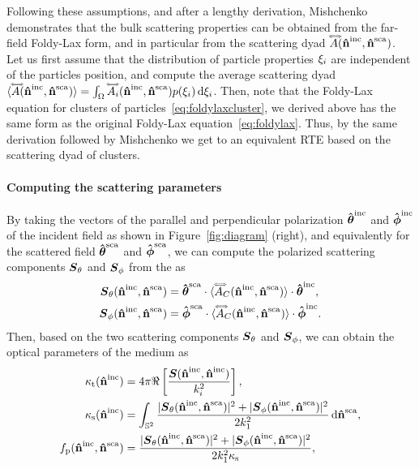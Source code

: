 Following these assumptions, and after a lengthy derivation, Mishchenko demonstrates that the bulk scattering properties can be obtained from the far-field Foldy-Lax form, and in particular from the scattering dyad $\accentset{\Longleftrightarrow}{A}(\mathbf{\hat{n}}^{\text{inc}},\mathbf{\hat{n}}^{\text{sca}})$. Let us first assume that the distribution of particle properties $\xi_i$ are independent of the particles position, and compute the average scattering dyad ${\langle \accentset{\Longleftrightarrow}{A}(\mathbf{\hat{n}}^{\text{inc}},\mathbf{\hat{n}}^{\text{sca}}) \rangle} = \int_\Omega \accentset{\Longleftrightarrow}{A}_i(\mathbf{\hat{n}}^{\text{inc}},\mathbf{\hat{n}}^{\text{sca}}) p(\xi_i) \,\text{d}\xi_i$. 
%
Then, note that the Foldy-Lax equation for clusters of particles~\eqref{eq:foldylaxcluster}, we derived above has the same form as the original Foldy-Lax equation~\eqref{eq:foldylax}. Thus, by the same derivation followed by Mishchenko we get to an equivalent RTE based on the scattering dyad of clusters. 

\paragraph{Computing the scattering parameters}
By taking the vectors of the parallel and perpendicular polarization $\mathbf{\hat{\boldsymbol\theta}}^\text{inc}$ and $\mathbf{\hat{\boldsymbol\phi}}^\text{inc}$ of the incident field as shown in Figure~\ref{fig:diagram} (right), and equivalently for the scattered field $\mathbf{\hat{\boldsymbol\theta}}^\text{sca}$ and $\mathbf{\hat{\boldsymbol\phi}}^\text{sca}$, we can compute the polarized scattering components $\boldsymbol{S}_\theta$ and $\boldsymbol{S}_\phi$ from the as
%
\begin{align}
  \boldsymbol{S}_\theta(\mathbf{\hat{n}}^{\text{inc}},\mathbf{\hat{n}}^{\text{sca}}) &= \mathbf{\hat{\boldsymbol\theta}}^\text{sca} \cdot {\langle \accentset{\Longleftrightarrow}{A}_C(\mathbf{\hat{n}}^{\text{inc}},\mathbf{\hat{n}}^{\text{sca}}) \rangle} \cdot \mathbf{\hat{\boldsymbol\theta}}^\text{inc}, \nonumber \\
  \boldsymbol{S}_\phi(\mathbf{\hat{n}}^{\text{inc}},\mathbf{\hat{n}}^{\text{sca}}) &= \mathbf{\hat{\boldsymbol\phi}}^\text{sca} \cdot {\langle \accentset{\Longleftrightarrow}{A}_C(\mathbf{\hat{n}}^{\text{inc}},\mathbf{\hat{n}}^{\text{sca}}) \rangle} \cdot \mathbf{\hat{\boldsymbol\phi}}^\text{inc}.
\end{align}
%
Then, based on the two scattering components $\boldsymbol{S}_\theta$ and $\boldsymbol{S}_\phi$, we can obtain the optical parameters of the medium as
%
\begin{align}
    \label{eq:crosstcluster}
    \kappa_\mathrm{t}(\mathbf{\hat{n}}^{\text{inc}}) &= 4\pi \Re\left[\frac{\boldsymbol{S}(\mathbf{\hat{n}}^{\text{inc}},\mathbf{\hat{n}}^{\text{inc}})}{k_i^2}\right], \\
    \label{eq:crossscluster}
    \kappa_\mathrm{s}(\mathbf{\hat{n}}^{\text{inc}}) &=\int_{\mathbb{S}^2} \frac{|\boldsymbol{S}_\theta(\mathbf{\hat{n}}^{\text{inc}},\mathbf{\hat{n}}^{\text{sca}})|^2+|\boldsymbol{S}_\phi(\mathbf{\hat{n}}^{\text{inc}},\mathbf{\hat{n}}^{\text{sca}})|^2}{2k_1^2} \,\text{d}\mathbf{\hat{n}}^{\text{sca}}, \\
    \label{eq:phasecluster}
    f_\mathrm{p}(\mathbf{\hat{n}}^{\text{inc}},\mathbf{\hat{n}}^{\text{sca}}) &= \frac{|\boldsymbol{S}_\theta(\mathbf{\hat{n}}^{\text{inc}},\mathbf{\hat{n}}^{\text{sca}})|^2+|\boldsymbol{S}_\phi(\mathbf{\hat{n}}^{\text{inc}},\mathbf{\hat{n}}^{\text{sca}})|^2}{2k_1^2\kappa_\mathrm{s}},
\end{align}

